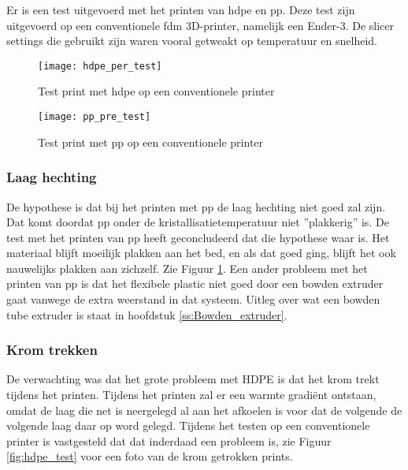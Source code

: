 Er is een test uitgevoerd met het printen van \ac{hdpe} en \ac{pp}.  Deze test
zijn uitgevoerd op een conventionele \ac{fdm} 3D-printer, namelijk een Ender-3.
De slicer settings die gebruikt zijn waren vooral getweakt op temperatuur en
snelheid.

\begin{figure}[h]
    \centering
    \begin{minipage}{0.45\textwidth}
        \centerline{\texttt{[image: hdpe\_per\_test]}}
        \caption{Test print met \ac{hdpe} op een conventionele printer}
        \label{fig:hdpe_test}
    \end{minipage}\hfill
    \begin{minipage}{0.45\textwidth}
        \centerline{\texttt{[image: pp\_pre\_test]}}
        \caption{Test print met \ac{pp} op een conventionele printer}
        \label{fig:pp_test}
    \end{minipage}
\end{figure}

\subsubsection{Laag hechting}

De hypothese is dat bij het printen met \ac{pp} de laag hechting niet goed zal
zijn. Dat komt doordat \ac{pp} onder de kristallisatietemperatuur niet
''plakkerig'' is. De test met het printen van \ac{pp} heeft geconcludeerd dat
die hypothese waar is. Het materiaal blijft moeilijk plakken aan het bed, en als
dat goed ging, blijft het ook nauwelijks plakken aan zichzelf. Zie Figuur
\ref{fig:pp_test}. Een ander probleem met het printen van \ac{pp} is dat het
flexibele plastic niet goed door een bowden extruder gaat vanwege de extra
weerstand in dat systeem. Uitleg over wat een bowden tube extruder is staat in
hoofdstuk \ref{ss:Bowden_extruder}.

\subsubsection{Krom trekken}

De verwachting was dat het grote probleem met HDPE is dat het krom trekt tijdens
het printen. Tijdens het printen zal er een warmte gradiënt ontstaan, omdat de
laag die net is neergelegd al aan het afkoelen is voor dat de volgende de
volgende laag daar op word gelegd. Tijdens het testen op een conventionele
printer is vastgesteld dat dat inderdaad een probleem is, zie Figuur
\ref{fig:hdpe_test} voor een foto van de krom getrokken prints.
